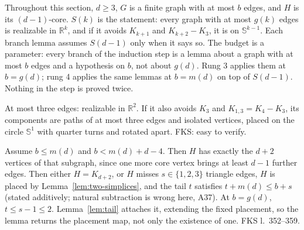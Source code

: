Throughout this section, $d \ge 3$, $G$ is a finite graph with at most $b$ edges, and $H$ is
its $(d-1)$-core. $S(k)$ is the statement: every graph with at most $g(k)$ edges is
realizable in $\mathbb{R}^k$, and if it avoids $K_{k+1}$ and $K_{k+2} - K_3$, it is on
$\mathbb{S}^{k-1}$. Each branch lemma assumes $S(d-1)$ only when it says so. The budget is a
parameter: every branch of the induction step is a lemma about a graph with at most $b$ edges
and a hypothesis on $b$, not about $g(d)$. Rung 3 applies them at $b = g(d)$; rung 4 applies
the same lemmas at $b = m(d)$ on top of $S(d-1)$. Nothing in the step is proved twice.

\begin{lemma}[$S(2)$]
  \label{lem:S2}
  \leanok
  At most three edges: realizable in $\mathbb{R}^2$. If it also avoids $K_3$ and
  $K_{1,3} = K_4 - K_3$, its components are paths of at most three edges and isolated
  vertices, placed on the circle $\mathbb{S}^1$ with quarter turns and rotated apart. FKS:
  easy to verify.
\end{lemma}

\begin{lemma}
  \label{lem:branch-A}
  \leanok
  Assume $b \le m(d)$ and $b < m(d) + d - 4$. Then $H$ has exactly the $d + 2$ vertices of
  that subgraph, since one more core vertex brings at least $d - 1$ further edges. Then
  either $H = K_{d+2}$, or $H$ misses $s \in \{1, 2, 3\}$ triangle edges, $H$ is placed by
  Lemma~\ref{lem:two-simplices}, and the tail $t$ satisfies $t + m(d) \le b + s$ (stated
  additively; natural subtraction is wrong here, A37). At $b = g(d)$, $t \le s - 1 \le 2$.
  Lemma~\ref{lem:tail} attaches it, extending the fixed placement, so the lemma returns the
  placement map, not only the existence of one. FKS l.~352--359.
\end{lemma}

